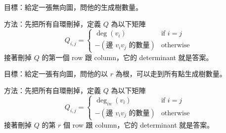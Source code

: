 目標：給定一張無向圖，問他的生成樹數量。

\noindent
方法：先把所有自環刪掉，定義 $Q$ 為以下矩陣
$$
Q_{i,j} =
\begin{cases}
\deg(v_{i}) &  \text{if } i=j \\
-(\text{邊 } v_{i}v_{j} \text{ 的數量}) & \text{otherwise}
\end{cases}
$$
接著刪掉 $Q$ 的第一個 row 跟 column，它的 determinant 就是答案。

\vspace{1em}
\hline
\vspace{1em}

\noindent
目標：給定一張有向圖，問他的以 $r$ 為根，可以走到所有點生成樹數量。

\noindent
方法：先把所有自環刪掉，定義 $Q$ 為以下矩陣
$$
Q_{i,j} =
\begin{cases}
\deg_{in}(v_{i}) &  \text{if } i=j \\
-(\text{邊 } v_{i}v_{j} \text{ 的數量}) & \text{otherwise}
\end{cases}
$$
\noindent
接著刪掉 $Q$ 的第 $r$ 個 row 跟 column，它的 determinant 就是答案。
